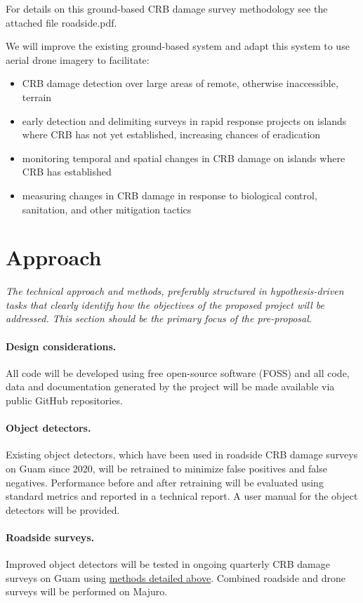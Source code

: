 \documentclass[11pt,english,letterpaper]{scrartcl}
\begin{document}
For details on this ground-based CRB damage survey methodology see the attached file roadside.pdf.

We will improve the existing ground-based system and adapt this system to use aerial drone imagery to facilitate:
\begin{itemize}
	\item CRB damage detection over large areas of remote, otherwise inaccessible, terrain
	\item early detection and delimiting surveys in rapid response projects on islands where CRB has not yet established, increasing chances of eradication
	\item monitoring temporal and spatial changes in CRB damage on islands where CRB has	established
	\item measuring changes in CRB damage in response to biological control, sanitation, and other mitigation tactics
\end{itemize}

\section{Approach}

\textit{The technical approach and methods, preferably structured in hypothesis-driven tasks that clearly identify how the objectives of the proposed project will be addressed. This section should be the primary focus of the pre-proposal.}

\paragraph{Design considerations.} All code will be developed using free open-source software (FOSS) and all code, data and documentation generated by the project will be made available via public GitHub repositories.

\paragraph{Object detectors.} Existing object detectors, which have been used in roadside CRB damage surveys on Guam since 2020, will be retrained to minimize false positives and false negatives. Performance before and after retraining will be evaluated using standard metrics and reported in a technical report. A user manual for the object detectors will be provided. 

\paragraph{Roadside surveys.} Improved object detectors will be tested in ongoing quarterly CRB damage surveys on Guam using \hyperref[previous_work]{methods detailed above}. Combined roadside and drone surveys will be performed on Majuro. 
\end{document}
